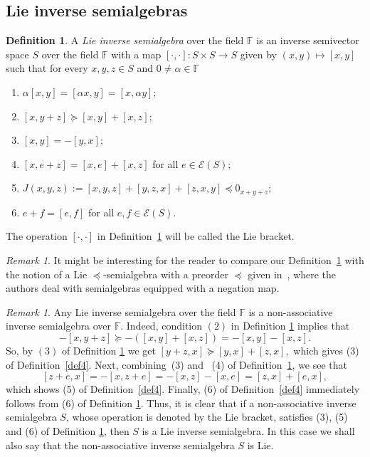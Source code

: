 \documentclass{amsart}
\newcommand{\E}{\mathcal{E}}
\newcommand{\F}{\mathbb{F}}
\newcommand{\0}{{\vartheta}}
\theoremstyle{definition}
\newtheorem{defn}[thm]{Definition}
\theoremstyle{remark}
\newtheorem{rem}[thm]{Remark}
\numberwithin{equation}{section}
\newtheorem*{Theorem A}{\textbf{Theorem A}}
\newtheorem*{Corollary E}{\textbf{Corollary E}}
\newtheorem*{Corollary F}{\textbf{Corollary F}}
\newtheorem*{Theorem B}{\textbf{Theorem B}}
\newtheorem*{Theorem C}{\textbf{Theorem C}}
\newtheorem*{Theorem D}{\textbf{Theorem B}}
\newtheorem*{p a}{\textbf{Proof of  Theorem A}}
\newtheorem*{p b}{\textbf{Proof of Theorem B}}
\newtheorem*{p c}{\textbf{Proof of  Theorem C}}
\newtheorem*{p d}{\textbf{Proof of  Theorem D}}
\begin{document}
\subsection{Lie inverse semialgebras}\label{subsec:LieInv}
\begin{defn}\label{def6}
   A {\em Lie  inverse semialgebra} over the field $\mathbb{F}$ is an inverse semivector space  $S$ over the field $\mathbb{F}$ with a map  
	$[\cdot,\cdot]:S \times S \rightarrow S$ given by $(x,y)\mapsto [x, y]$  such that for every $x,y,z\in S$ and  $0\neq \alpha\in \F$
   \begin{enumerate}
     
     \item $ \alpha [x,y]= [\alpha x,y]= [x,\alpha y];$
     \item $[x,y+z]\succeq [x,y]+[x,z];$
     \item $[x,y]=-[y,x];$
     \item  $[x,e+z]= [x,e]+[x,z]$ for all $e\in \E(S);$
     \item $J(x,y,z):=[x,y,z]+[y,z,x]+[z,x,y]\preceq 0_{x+y+z};$
     \item $e+f=[e,f] $ for all $e,f\in \E(S).$
   \end{enumerate}
\end{defn}
 The operation $[\cdot,\cdot]$ in Definition~\ref{def6} will be called the Lie bracket.

 \begin{rem}  It might be interesting for the reader to compare our Definition~\ref{def6} with the notion of a Lie $\preceq$-semialgebra with a preorder $\preceq$ given  in~\cite[Definition 3.4]{Chapman}, where the authors deal with semialgebras equipped with a negation map.
\end{rem}


\begin{rem}\label{rem:LieInverseOk} Any Lie  inverse semialgebra over the field $\mathbb{F}$ is a non-associative inverse semialgebra over $\mathbb{F}.$ Indeed,    condition $(2)$ in  Definition \ref{def6} implies that $$-[x,y+z]\succeq -( [x,y]+[x,z])=- [x,y]-[x,z].$$ So, by $(3)$ of Definition \ref{def6}  we get $[y+z,x]\succeq [y,x]+[z,x],$ which gives (3) of Definition~\ref{def4}. Next,  combining~(3) and ~(4) of Definition~\ref{def6},  we see that $$[z+e,x]=-[x,z+e]=-[x,z]-[x,e]=[z,x]+[e,x],$$
which shows (5) of Definition~\ref{def4}. Finally, (6)
of Definition~\ref{def4} immediately follows from
(6) of Definition \ref{def6}. Thus, it is clear that if a 
 non-associative inverse semialgebra $S$, whose operation is denoted by the Lie bracket, satisfies  (3), (5) and (6)
 of Definition \ref{def6}, then $S$ is a Lie  inverse semialgebra. In this case we shall also say that   the non-associative inverse semialgebra $S$ is Lie.
\end{rem}
\end{document}
